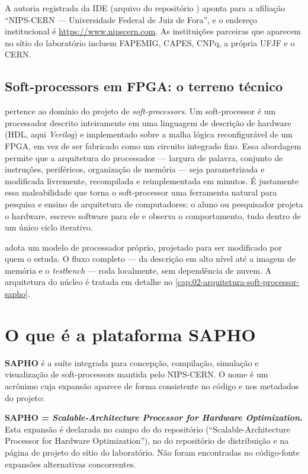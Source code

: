 A autoria registrada da IDE  (arquivo  do
repositório ) aponta para a afiliação \enquote{NIPS-CERN ---
Universidade Federal de Juiz de Fora}, e o endereço institucional é
\url{https://www.nipscern.com}. As instituições parceiras que aparecem no sítio
do laboratório incluem FAPEMIG, CAPES, CNPq, a própria UFJF e o CERN.

\subsection{Soft-processors em FPGA: o terreno técnico}
\label{sec:01-soft-processor}

 pertence ao domínio do projeto de \emph{soft-processors}. Um
soft-processor é um processador descrito inteiramente em uma linguagem de
descrição de hardware (HDL, aqui \emph{Verilog}) e implementado sobre a malha
lógica reconfigurável de um FPGA, em vez de ser fabricado como um circuito
integrado fixo. Essa abordagem permite que a arquitetura do processador ---
largura de palavra, conjunto de instruções, periféricos, organização de memória
--- seja parametrizada e modificada livremente, recompilada e reimplementada em
minutos. É justamente essa maleabilidade que torna o soft-processor uma
ferramenta natural para pesquisa e ensino de arquitetura de computadores: o
aluno ou pesquisador projeta o hardware, escreve software para ele e observa o
comportamento, tudo dentro de um único ciclo iterativo.

 adota um modelo de processador próprio, projetado para ser
modificado por quem o estuda. O fluxo completo --- da descrição em alto nível
até a imagem de memória e o \emph{testbench} --- roda localmente, sem dependência
de nuvem. A arquitetura do núcleo  é tratada em detalhe no
\autoref{cap:02-arquitetura-soft-processor-sapho}.

\section{O que é a plataforma SAPHO}
\label{sec:01-o-que-e-sapho}

\textbf{SAPHO} é a suíte integrada para concepção, compilação, simulação e
visualização de soft-processors mantida pelo NIPS-CERN. O nome é um acrônimo cuja
expansão aparece de forma consistente no código e nos metadados do projeto:

\begin{nota}
\textbf{SAPHO = \emph{Scalable-Architecture Processor for Hardware Optimization}.}
Esta expansão é declarada no campo  do  do
repositório  (\enquote{Scalable-Architecture Processor for Hardware
Optimization}), no  do repositório de distribuição 
e na página de projeto do sítio do laboratório. Não foram encontradas no
código-fonte expansões alternativas concorrentes.
\end{nota}

